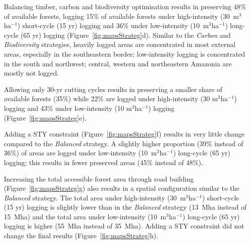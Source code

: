 \documentclass{article}
\begin{document}
Balancing timber, carbon and biodiversity optimisation results in preserving 48\% of available forests, logging 15\% of available forests under high-intensity (30~m$^3$ha$^{-1}$) short-cycle (15 yr) logging and 36\% under low-intensity (10~m$^3$ha$^{-1}$) long-cycle (65 yr) logging (Figure~\ref{fig:mapsStrateg}d). Similar to the \textit{Carbon} and \textit{Biodiversity} strategies, heavily logged areas are concentrated in most external areas, especially in the southeastern border; low-intensity logging is concentrated in the south and northwest; central, western and northeastern Amazonia are mostly not logged. 

Allowing only 30-yr cutting cycles results in preserving a smaller share of available forests (35\%) while 22\% are logged under high-intensity (30 m$^3$ha$^{-1}$) logging and 43\% under low-intensity (10 m$^3$ha$^{-1}$) logging (Figure~\ref{fig:mapsStrateg}e). 

Adding a STY constraint (Figure~\ref{fig:mapsStrateg}f) results in very little change compared to the \textit{Balanced} strategy. A slightly higher proportion (39\% instead of 36\%) of areas are logged under low-intensity (10~m$^3$ha$^{-1}$) long-cycle (65 yr) logging; this results in fewer preserved areas (45\% instead of 48\%). 

Increasing the total accessible forest area through road building (Figure~\ref{fig:mapsStrateg}g) also results in a spatial configuration similar to the \textit{Balanced} strategy. The total area under high-intensity (30~m$^3$ha$^{-1}$) short-cycle (15 yr) logging is slightly lower than in the \textit{Balanced} strategy (13~Mha instead of 15~Mha) and the total area under low-intensity (10~m$^3$ha$^{-1}$) long-cycle (65 yr) logging is higher (55~Mha instead of 35~Mha). Adding a STY constraint did not change the final results (Figure~\ref{fig:mapsStrateg}h). 
\end{document}
